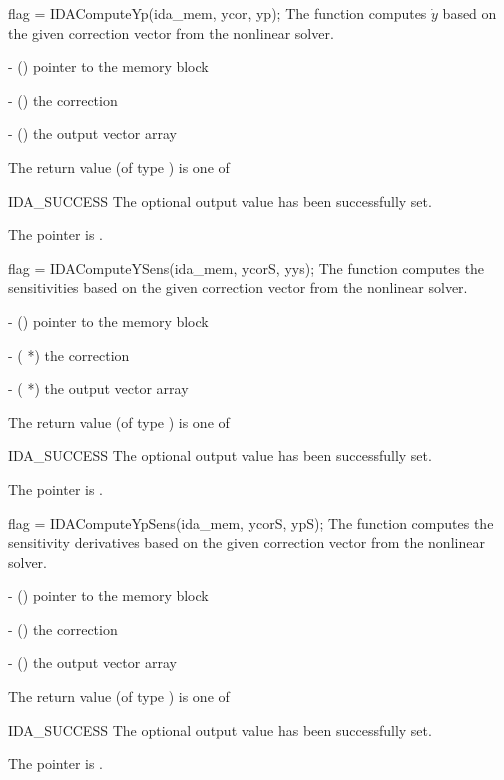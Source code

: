 {
  flag = IDAComputeYp(ida\_mem, ycor, yp);
}
{
  The function computes $\dot{y}$ based on the given correction
  vector from the nonlinear solver.
}
{
  \begin{args}
    \item {} - () pointer to the {\ida} memory block
    \item {} - () the correction
    \item {} - () the output vector array
  \end{args}
}
{
  The return value  (of type ) is one of
  \begin{args}
  \item[IDA\_SUCCESS]
    The optional output value has been successfully set.
  \item[\Id{IDA\_MEM\_NULL}]
    The  pointer is .
  \end{args}
}
{}

{
  flag = IDAComputeYSens(ida\_mem, ycorS, yys);
}
{
  The function computes the sensitivities based on the given correction
  vector from the nonlinear solver.
}
{
  \begin{args}
    \item {} - () pointer to the {\ida} memory block
    \item {} - ( *) the correction
    \item {} - ( *) the output vector array
  \end{args}
}
{
  The return value  (of type ) is one of
  \begin{args}
  \item[IDA\_SUCCESS]
    The optional output value has been successfully set.
  \item[\Id{IDA\_MEM\_NULL}]
    The  pointer is .
  \end{args}
}
{}

{
  flag = IDAComputeYpSens(ida\_mem, ycorS, ypS);
}
{
  The function computes the sensitivity derivatives based on the
  given correction vector from the nonlinear solver.
}
{
  \begin{args}
    \item {} - () pointer to the {\ida} memory block
    \item {} - () the correction
    \item {} - () the output vector array
  \end{args}
}
{
  The return value  (of type ) is one of
  \begin{args}
  \item[IDA\_SUCCESS]
    The optional output value has been successfully set.
  \item[\Id{IDA\_MEM\_NULL}]
    The  pointer is .
  \end{args}
}
{}




